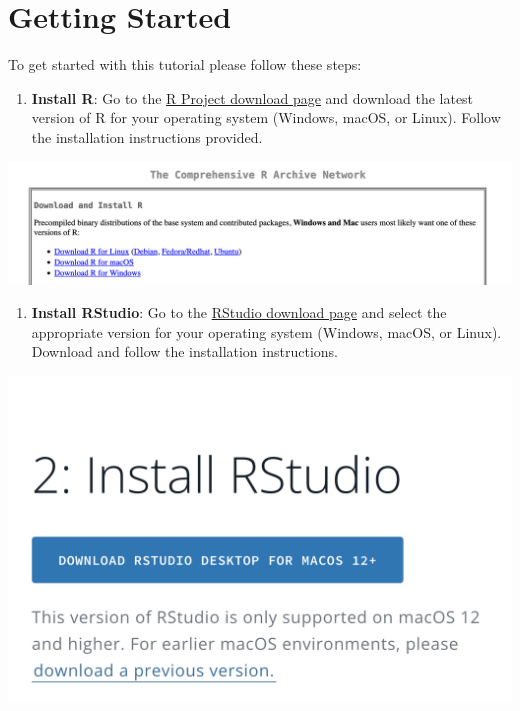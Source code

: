 \documentclass[
]{book}
\providecommand{\tightlist}{%
  \setlength{\itemsep}{0pt}\setlength{\parskip}{0pt}}
\theoremstyle{definition}
\theoremstyle{definition}
\theoremstyle{definition}
\theoremstyle{definition}
\theoremstyle{remark}
\begin{document}
\section{Getting Started}\label{getting-started}

To get started with this tutorial please follow these steps:

\begin{enumerate}
\def\labelenumi{\arabic{enumi}.}
\tightlist
\item
  \textbf{Install R}:
  Go to the \href{https://cran.r-project.org/}{R Project download page} and download the latest version of R for your operating system (Windows, macOS, or Linux). Follow the installation instructions provided.
\end{enumerate}

\includegraphics{images/tutorialscreenshots/installR.png}

\begin{enumerate}
\def\labelenumi{\arabic{enumi}.}
\setcounter{enumi}{1}
\tightlist
\item
  \textbf{Install RStudio}:
  Go to the \href{https://posit.co/download/rstudio-desktop/}{RStudio download page} and select the appropriate version for your operating system (Windows, macOS, or Linux). Download and follow the installation instructions.
\end{enumerate}

\includegraphics{images/tutorialscreenshots/installRStudio.png}
\end{document}
